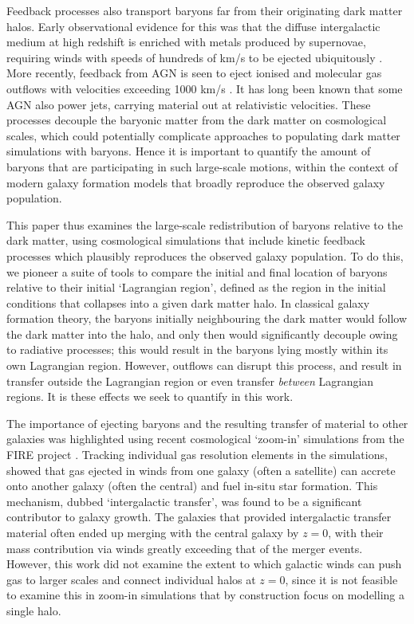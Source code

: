 Feedback processes also transport baryons far
from their originating dark matter halos. Early observational evidence for
this was that the diffuse intergalactic medium at high redshift is enriched
with metals produced by supernovae, requiring winds with speeds of hundreds
of km/s to be ejected ubiquitously \citep[e.g.][]{Aguirre2001, Springel2003,
 Oppenheimer2006}. More recently, feedback from AGN is seen to eject ionised
and molecular gas outflows with velocities exceeding 1000 km/s
\citep[e.g.][]{Sturm2001, Maiolino2012}. It has long been known that some AGN
also power jets, carrying material out at relativistic velocities. These
processes decouple the baryonic matter from the dark matter on cosmological
scales, which could potentially complicate approaches to populating dark
matter simulations with baryons. Hence it is important to quantify the amount
of baryons that are participating in such large-scale motions, within the
context of modern galaxy formation models that broadly reproduce the observed
galaxy population.

This paper thus examines the large-scale redistribution of baryons relative
to the dark matter, using cosmological simulations that include kinetic
feedback processes which plausibly reproduces the observed galaxy population.
To do this, we pioneer a suite of tools to compare the initial and final
location of baryons relative to their initial `Lagrangian region', defined as
the region in the initial conditions that collapses into a given dark matter
halo. In classical galaxy formation theory, the baryons initially neighbouring
the dark matter would follow the dark matter into the halo, and only then
would significantly decouple owing to radiative processes; this would result
in the baryons lying mostly within its own Lagrangian region. However,
outflows can disrupt this process, and result in transfer outside the
Lagrangian region or even transfer \emph{between} Lagrangian regions. It is
these effects we seek to quantify in this work.

The importance of ejecting baryons and the resulting transfer of material to
other galaxies was highlighted using recent cosmological `zoom-in'
simulations from the FIRE project \citep{Hopkins2014,Hopkins2018}.
Tracking individual gas resolution elements in the simulations, \citet{AnglesAlcazar2017} showed that gas ejected in winds from one galaxy
(often a satellite) can accrete onto another galaxy (often the central) and fuel in-situ star formation. This mechanism, dubbed `intergalactic transfer', was found to be a
significant contributor to galaxy growth. The galaxies
that provided intergalactic transfer material often ended up merging
with the central galaxy by $z=0$, with their mass contribution via winds greatly exceeding that of the merger events.
However, this work did not examine the extent to which galactic winds can push gas to
larger scales and connect individual halos at $z=0$, since it is not feasible to
examine this in zoom-in simulations that by construction focus on modelling a single halo.

